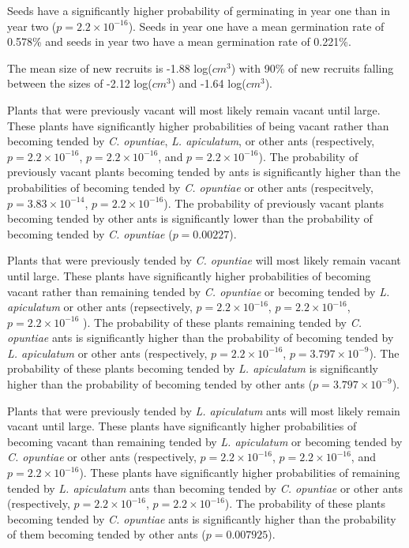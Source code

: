 \documentclass[11pt]{article}
\begin{document}
Seeds have a significantly higher probability of germinating in year one than in year two ($p = 2.2 \times 10^{-16}$).
Seeds in year one have a mean germination rate of 0.578\% and seeds in year two have a mean germination rate of 0.221\%. 

 The mean size of new recruits is -1.88 log($cm^3$) with 90\% of new recruits falling between the sizes of -2.12 log($cm^3$) and -1.64 log($cm^3$).
 
Plants that were previously vacant will most likely remain vacant until large. 
These plants have significantly higher probabilities of being vacant rather than becoming tended  by \textit{C. opuntiae}, \textit{L. apiculatum}, or other ants (respectively, $p = 2.2 \times 10^{-16}$, $p = 2.2 \times 10^{-16}$, and $p = 2.2 \times 10^{-16}$).
The probability of previously vacant plants becoming tended by  ants is significantly higher than the probabilities of becoming tended by \textit{C. opuntiae} or other ants (respecitvely, $p = 3.83 \times 10^{-14}$, $p = 2.2 \times 10^{-16}$).
The probability of previously vacant plants becoming tended by other ants is significantly lower than the probability of becoming tended by \textit{C. opuntiae} ($p = 0.00227$).

Plants that were previously tended by \textit{C. opuntiae} will most likely remain vacant until large. 
These plants have significantly higher probabilities of becoming vacant rather than remaining tended by \textit{C. opuntiae} or becoming tended by \textit{L. apiculatum} or other ants (repsectively, $p = 2.2 \times 10^{-16}$, $p = 2.2 \times 10^{-16}$, $p = 2.2 \times 10^{-16}$ ).
The probability of these plants remaining tended by \textit{C. opuntiae} ants is significantly higher than the probability of becoming tended by \textit{L. apiculatum} or other ants (respectively, $p = 2.2 \times 10^{-16}$, $p = 3.797 \times 10^{-9}$).
The probability of these plants becoming tended by \textit{L. apiculatum} is significantly higher than the probability of becoming tended by other ants ($p = 3.797 \times 10^{-9}$).

Plants that were previously tended by \textit{L. apiculatum} ants will most likely remain vacant until large. 
These plants have significantly higher probabilities of becoming vacant than remaining tended by \textit{L. apiculatum} or becoming tended by \textit{C. opuntiae} or other ants (respectively, $p = 2.2 \times 10^{-16}$, $p = 2.2 \times 10^{-16}$, and $p = 2.2 \times 10^{-16}$).
These plants have significantly higher probabilities of remaining tended by \textit{L. apiculatum} ants than becoming tended by  \textit{C. opuntiae} or other ants (respectively, $p = 2.2 \times 10^{-16}$, $p = 2.2 \times 10^{-16}$).
The probability of these plants becoming tended by \textit{C. opuntiae} ants is significantly higher than the probability of them becoming tended by other ants ($p = 0.007925$).
\end{document}
